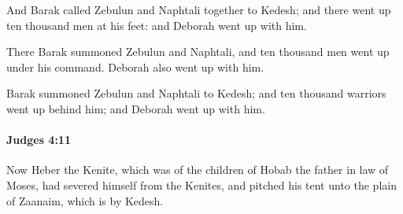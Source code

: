 			\begin{versebox}
					\item[BHS] 
					\item[ASV] And Barak called Zebulun and Naphtali together to Kedesh; and there went up ten thousand men at his feet: and Deborah went up with him.
					\item[NIV] There Barak summoned Zebulun and Naphtali, and ten thousand men went up under his command. Deborah also went up with him.
					\item[NRSV] Barak summoned Zebulun and Naphtali to Kedesh; and ten thousand warriors went up behind him; and Deborah went up with him.
			\end{versebox}

		\paragraph{Judges 4:11} %
			\label{JUDGES-4-11}

			Now Heber the Kenite, which was of the children of Hobab the father in law of Moses, had severed himself from the Kenites, and pitched his tent unto the plain of Zaanaim, which is by Kedesh.

